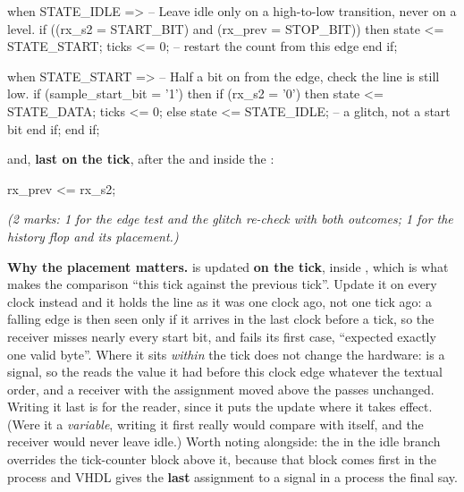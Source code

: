 \begin{vhdlcode}
when STATE_IDLE =>
    -- Leave idle only on a high-to-low transition, never on a level.
    if ((rx_s2 = START_BIT) and (rx_prev = STOP_BIT)) then
        state <= STATE_START;
        ticks <= 0;              -- restart the count from this edge
    end if;

when STATE_START =>
    -- Half a bit on from the edge, check the line is still low.
    if (sample_start_bit = '1') then
        if (rx_s2 = '0') then
            state <= STATE_DATA;
            ticks <= 0;
        else
            state <= STATE_IDLE; -- a glitch, not a start bit
        end if;
    end if;
\end{vhdlcode}

\noindent and, \textbf{last on the tick}, after the  and inside the
:

\begin{vhdlcode}
rx_prev <= rx_s2;
\end{vhdlcode}

{\itshape (2 marks: 1 for the edge test and the glitch re-check with both outcomes; 1 for the history
flop and its placement.)\par}

\medskip
\textbf{Why the placement matters.}  is updated \textbf{on the tick}, inside
, which is what makes the comparison ``this tick against the previous
tick''. Update it on every clock instead and it holds the line as it was one clock ago, not one tick
ago: a falling edge is then seen only if it arrives in the last clock before a tick, so the receiver
misses nearly every start bit, and  fails its first case, ``expected exactly one
valid byte''. Where it sits \emph{within} the tick does not change the hardware:  is a
signal, so the  reads the value it had before this clock edge whatever the textual order,
and a receiver with the assignment moved above the  passes  unchanged.
Writing it last is for the reader, since it puts the update where it takes effect. (Were it a
\emph{variable}, writing it first really would compare  with itself, and the receiver
would never leave idle.) Worth noting alongside: the  in the idle branch overrides
the tick-counter block above it, because that block comes first in the process and VHDL gives the
\textbf{last} assignment to a signal in a process the final say.

